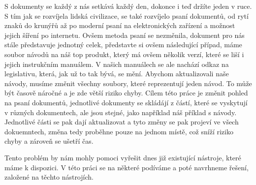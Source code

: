 S dokumenty se každý z nás setkává každý den, dokonce i teď držíte jeden v ruce. S tím jak se rozvíjela lidská civilizace,
se také rozvíjelo psaní dokumentů, od rytí znaků do krunýřů až po moderní psaní na elektronických zařízení a možnost jejich šíření po internetu.
Ovšem metoda psaní se nezměnila, dokument pro nás stále představuje jednotný celek, představte si ovšem následující případ, máme soubor návodů na náš top
produkt, který má ovšem několik verzí, které se liší i jejich instrukčním manuálem. V našich manuálech se ale nachází odkaz na legislativu, která, jak už to tak
bývá, se mění. Abychom aktualizovali naše návody, musíme změnit všechny soubory, které reprezentují jeden návod. To může být časově náročné a je zde větší riziko
chyby. Cílem této práce je změnit pohled na psaní dokumentů, jednotlivé dokumenty se skládájí z částí, které se vyskytují v různých dokumentech, ale jsou stejné,
jako například náš příklad s návody. Jednotlivé části se pak dají aktualizovat a tyto změny se pak projeví ve všech dokuemntech, změna tedy proběhne
pouze na jednom místě, což sníží riziko chyby a zároveň se ušetří čas.

Tento problém by nám mohly pomoci vyřešit dnes již existující nástroje, které máme k dispozici. V této práci se na některé podíváme a poté navrhneme řešení, založené
na těchto nástrojích.